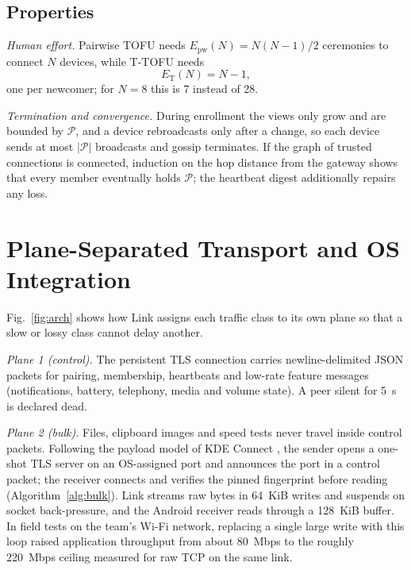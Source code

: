 \documentclass[conference,a4paper]{IEEEtran}
\newcommand{\PP}{\mathcal{P}}
\begin{document}
\subsection{Properties}
\textit{Human effort.} Pairwise TOFU needs $E_{\mathrm{pw}}(N)=N(N-1)/2$ ceremonies to connect $N$ devices, while T-TOFU needs
\begin{equation}
E_{\mathrm{T}}(N)=N-1,
\end{equation}
one per newcomer; for $N=8$ this is 7 instead of 28.

\textit{Termination and convergence.} During enrollment the views only grow and are bounded by $\PP$, and a device rebroadcasts only after a change, so each device sends at most $|\PP|$ broadcasts and gossip terminates. If the graph of trusted connections is connected, induction on the hop distance from the gateway shows that every member eventually holds $\PP$; the heartbeat digest additionally repairs any loss.

\section{Plane-Separated Transport and OS Integration}
\label{sec:transport}
Fig.~\ref{fig:arch} shows how Link assigns each traffic class to its own plane so that a slow or lossy class cannot delay another.


\textit{Plane 1 (control).} The persistent TLS connection carries newline-delimited JSON packets for pairing, membership, heartbeats and low-rate feature messages (notifications, battery, telephony, media and volume state). A peer silent for 5~s is declared dead.

\textit{Plane 2 (bulk).} Files, clipboard images and speed tests never travel inside control packets. Following the payload model of KDE Connect \cite{kdeconnect}, the sender opens a one-shot TLS server on an OS-assigned port and announces the port in a control packet; the receiver connects and verifies the pinned fingerprint before reading (Algorithm~\ref{alg:bulk}). Link streams raw bytes in 64~KiB writes and suspends on socket back-pressure, and the Android receiver reads through a 128~KiB buffer. In field tests on the team's Wi-Fi network, replacing a single large write with this loop raised application throughput from about 80~Mbps to the roughly 220~Mbps ceiling measured for raw TCP on the same link.
\end{document}
